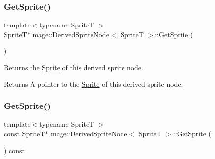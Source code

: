 \hypertarget{classmage_1_1_derived_sprite_node_a4f380d16fcd3804d08d1f6f42ecc4780}{}\label{classmage_1_1_derived_sprite_node_a4f380d16fcd3804d08d1f6f42ecc4780} 
\subsubsection{\texorpdfstring{Get\+Sprite()}{GetSprite()}\hspace{0.1cm}{\footnotesize\ttfamily [1/2]}}
{\footnotesize\ttfamily template$<$typename SpriteT $>$ \\
SpriteT$\ast$ \hyperlink{classmage_1_1_derived_sprite_node}{mage\+::\+Derived\+Sprite\+Node}$<$ SpriteT $>$\+::Get\+Sprite (\begin{DoxyParamCaption}{ }\end{DoxyParamCaption})\hspace{0.3cm}{\ttfamily [noexcept]}}

Returns the \hyperlink{classmage_1_1_sprite}{Sprite} of this derived sprite node.

\begin{DoxyReturn}{Returns}
A pointer to the \hyperlink{classmage_1_1_sprite}{Sprite} of this derived sprite node. 
\end{DoxyReturn}
\hypertarget{classmage_1_1_derived_sprite_node_a9daf3412c118dcb50f0175d3d00be9bc}{}\label{classmage_1_1_derived_sprite_node_a9daf3412c118dcb50f0175d3d00be9bc} 
\subsubsection{\texorpdfstring{Get\+Sprite()}{GetSprite()}\hspace{0.1cm}{\footnotesize\ttfamily [2/2]}}
{\footnotesize\ttfamily template$<$typename SpriteT $>$ \\
const SpriteT$\ast$ \hyperlink{classmage_1_1_derived_sprite_node}{mage\+::\+Derived\+Sprite\+Node}$<$ SpriteT $>$\+::Get\+Sprite (\begin{DoxyParamCaption}{ }\end{DoxyParamCaption}) const\hspace{0.3cm}{\ttfamily [noexcept]}}


